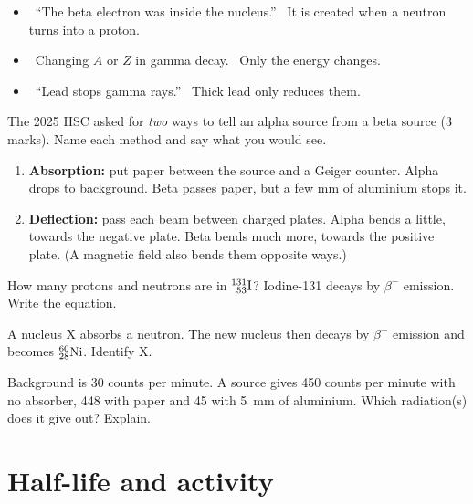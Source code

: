 \begin{mistakes}
\begin{itemize}
  \item \xmark\ ``The beta electron was inside the nucleus.''
        \cmark\ It is created when a neutron turns into a proton.
  \item \xmark\ Changing $A$ or $Z$ in gamma decay. \cmark\ Only the energy changes.
  \item \xmark\ ``Lead stops gamma rays.'' \cmark\ Thick lead only reduces them.
\end{itemize}
\end{mistakes}

\begin{examtip}
The 2025 HSC asked for \emph{two} ways to tell an alpha source from a beta source
(3 marks). Name each method and say what you would see.
\begin{enumerate}
  \item \textbf{Absorption:} put paper between the source and a Geiger counter. Alpha
        drops to background. Beta passes paper, but a few mm of aluminium stops it.
  \item \textbf{Deflection:} pass each beam between charged plates. Alpha bends a
        little, towards the negative plate. Beta bends much more, towards the
        positive plate. (A magnetic field also bends them opposite ways.)
\end{enumerate}
\end{examtip}

\begin{quickcheck}
  \item How many protons and neutrons are in $\chFourNuc{131}{53}{I}$? Iodine-131
        decays by $\beta^-$ emission. Write the equation.
  \item A nucleus X absorbs a neutron. The new nucleus then decays by $\beta^-$
        emission and becomes $\chFourNuc{60}{28}{Ni}$. Identify X.
  \item Background is 30 counts per minute. A source gives 450 counts per minute with
        no absorber, 448 with paper and 45 with \qty{5}{mm} of aluminium. Which
        radiation(s) does it give out? Explain.
\end{quickcheck}

\section{Half-life and activity}\label{ch4:sec:halflife}


